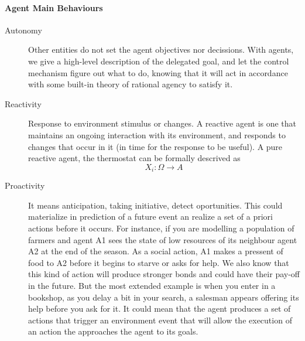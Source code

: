 \documentclass[11pt,oneside,a4paper,openright]{report}
\begin{document}
\paragraph{Agent Main Behaviours}
\begin{description}
	\item [Autonomy] Other entities do not set the agent objectives nor decissions. With agents, 
	we give a high-level description of the delegated goal, and let the control mechanism figure
	out what to do, knowing that it will act in accordance with some built-in theory of rational 
	agency to satisfy it.

	\item [Reactivity] Response to environment stimulus or changes. A reactive agent is 
	one that maintains an ongoing interaction with its environment, and responds to changes 
	that occur in it (in time for the response to be useful). A pure reactive agent, the 
	thermostat can be formally descrived as
	\begin{equation}
		X_i : \Omega \longrightarrow A 
	\end{equation}
	\item [Proactivity] It means anticipation, taking initiative, detect oportunities. This
	could materialize in prediction of a future event an realize a set of a priori actions 
	before it occurs. For instance, if you are modelling a population of farmers and agent A1 
	sees the state of low resources of its neighbour agent A2 at the end of the season. As 
	a social action, A1 makes a pressent of food to A2 before it begins to starve or asks for
	help. We also know that this kind of action will produce stronger bonds and could have their
	pay-off in the future. But the most extended example is when you enter in a bookshop, 
	as you delay a bit in your search, a salesman appears offering its help before you ask for it.
	It could mean that the agent produces a set of actions that trigger an environment event
	that will allow the execution of an action the approaches the agent to its goals.


\end{description}
\end{document}

